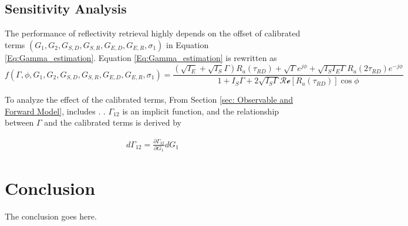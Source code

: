 \documentclass[draftcls,onecolumn]{IEEEtran}  %
\begin{document}
\subsection{Sensitivity Analysis}
The performance of reflectivity retrieval highly depends on the offset of calibrated terms $(G_1, G_2, G_{S,D}, G_{S,R}, G_{E,D}, G_{E,R}, \sigma_1)$ in Equation \ref{Eq:Gamma_estimation}. Equation \ref{Eq:Gamma_estimation} is rewritten as
\begin{equation}
f(\Gamma, \phi, G_1, G_2, G_{S,D}, G_{S,R}, G_{E,D}, G_{E,R}, \sigma_1) =
	\frac{(\sqrt{I_E}+\sqrt{I_S}\Gamma)R_a(\tau_{RD})+\sqrt{\Gamma} 
    e^{j\phi}+\sqrt{I_S I_E\Gamma} R_a(2\tau_{RD})e^{-j\phi}} 
    {1 + I_S \Gamma + 2 \sqrt{I_S \Gamma} \mathcal{Re}[ R_a(\tau_{RD})] \cos \phi}
        \label{Eq:Gamma_uncertainty}
\end{equation}

To analyze the effect of the calibrated terms,  
From Section \ref{sec: Observable and Forward Model},  includes  . . $\Gamma_{12}$ is an implicit function, and the relationship between $\Gamma$ and the calibrated terms is derived by

\begin{eqnarray}
d\Gamma_{12} = \frac{\partial \Gamma_{12}}{\partial G_1} dG_1 
\end{eqnarray}


\section{Conclusion}
The conclusion goes here.






\end{document}
